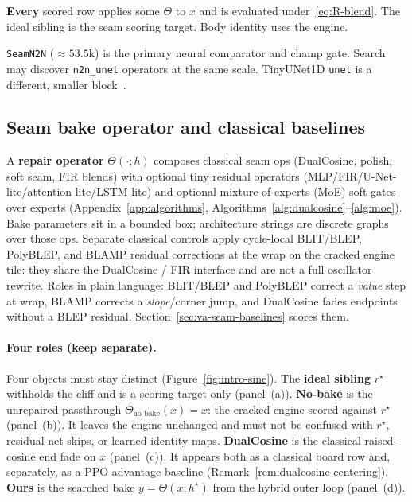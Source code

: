 \textbf{Every} scored row applies some $\Theta$ to $x$ and is evaluated under~\eqref{eq:R-blend}.
The ideal sibling is the seam scoring target. Body identity uses the engine.

\begin{remark}
\label{rem:n2n}
\texttt{SeamN2N} (${\approx}53.5$k) is the primary neural comparator and champ gate.
Search may discover \texttt{n2n\_unet} operators at the same scale. TinyUNet1D \texttt{unet} is a different, smaller block~\cite{lehtinen2018,kashyap2021n2n}.
\end{remark}

\subsection{Seam bake operator and classical baselines}
\label{sec:bake}

A \textbf{repair operator} $\Theta(\cdot;h)$ composes classical seam ops (DualCosine, polish, soft seam, FIR blends) with optional tiny residual operators (MLP/FIR/U-Net-lite/attention-lite/LSTM-lite) and optional mixture-of-experts (MoE) soft gates over experts (Appendix~\ref{app:algorithms}, Algorithms~\ref{alg:dualcosine}--\ref{alg:moe}).
Bake parameters sit in a bounded box; architecture strings are discrete graphs over those ops.
Separate classical controls apply cycle-local BLIT/BLEP, PolyBLEP, and BLAMP residual corrections at the wrap on the cracked engine tile: they share the DualCosine / FIR interface and are not a full oscillator rewrite.
Roles in plain language: BLIT/BLEP and PolyBLEP correct a \emph{value} step at wrap, BLAMP corrects a \emph{slope}/corner jump, and DualCosine fades endpoints without a BLEP residual.
Section~\ref{sec:va-seam-baselines} scores them.

\paragraph{Four roles (keep separate).}
\label{sec:four-roles}
Four objects must stay distinct (Figure~\ref{fig:intro-sine}).
The \textbf{ideal sibling} $r^{\star}$ withholds the cliff and is a scoring target only (panel~(a)).
\textbf{No-bake} is the unrepaired passthrough $\Theta_{\mathrm{no\text{-}bake}}(x)=x$: the cracked engine scored against $r^{\star}$ (panel~(b)).
It leaves the engine unchanged and must not be confused with $r^{\star}$, residual-net skips, or learned identity maps.
\textbf{DualCosine} is the classical raised-cosine end fade on $x$ (panel~(c)).
It appears both as a classical board row and, separately, as a PPO advantage baseline (Remark~\ref{rem:dualcosine-centering}).
\textbf{Ours} is the searched bake $y=\Theta(x;h^{\star})$ from the hybrid outer loop (panel~(d)).

